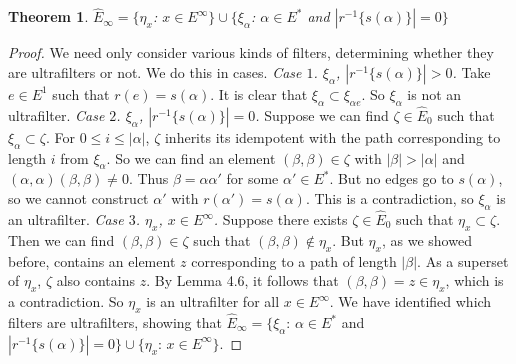 \documentclass[12pt]{article}
\newtheorem{theorem}{Theorem}[section]
\theoremstyle{definition}
\begin{document}
\begin{theorem} $\hat{E}_\infty = \{\eta_x$: $x \in E^\infty\} \cup \{\xi_\alpha$: $\alpha \in E^*$ and $|r^{-1}\{s(\alpha)\}| = 0 \}$ \end{theorem}
\begin{proof}
    We need only consider various kinds of filters, determining whether they are ultrafilters or not. We do this in cases.
    \newline
    \emph{Case $1$. $\xi_\alpha$, $|r^{-1}\{s(\alpha)\}| > 0$.} Take $e \in E^1$ such that $r(e) = s(\alpha)$. It is clear that
    $\xi_\alpha \subset \xi_{\alpha e}$. So $\xi_\alpha$ is not an ultrafilter.
    \newline
    \emph{Case $2$. $\xi_\alpha$, $|r^{-1}\{s(\alpha)\}| = 0$.} Suppose we can find $\zeta \in \hat{E}_0$ such that $\xi_\alpha \subset \zeta$.
    For $0 \leq i \leq |\alpha|$, $\zeta$ inherits its idempotent with the path corresponding to length $i$ from $\xi_\alpha$. So we can find an element $(\beta, \beta) \in \zeta$ with
    $|\beta| > |\alpha|$ and $(\alpha, \alpha)(\beta, \beta) \neq 0$. Thus $\beta = \alpha \alpha'$ for some $\alpha' \in E^*$. But no edges go to $s(\alpha)$, so we cannot
    construct $\alpha'$ with $r(\alpha') = s(\alpha)$. This is a contradiction, so $\xi_\alpha$ is an ultrafilter.
    \newline
    \emph{Case $3$. $\eta_x$, $x \in E^\infty$.} Suppose there exists $\zeta \in \hat{E}_0$ such that $\eta_x \subset \zeta$. Then we can find
    $(\beta, \beta) \in \zeta$ such that $(\beta, \beta) \notin \eta_x$. But $\eta_x$, as we showed before, contains an element $z$ corresponding to
    a path of length $|\beta|$. As a superset of $\eta_x$, $\zeta$ also contains $z$. By Lemma 4.6, it follows that $(\beta, \beta) = z \in \eta_x$,
    which is a contradiction. So $\eta_x$ is an ultrafilter for all $x \in E^\infty$.
    \newline
    We have identified which filters are ultrafilters, showing that $\hat{E}_\infty = \{\xi_\alpha$: $\alpha \in E^*$ and $|r^{-1}\{s(\alpha)\}| = 0\} \cup \{\eta_x$: $x \in E^\infty\}$.
\end{proof}
\end{document}
